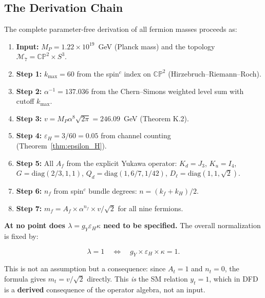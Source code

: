 \documentclass[11pt,a4paper]{article}
\newcommand{\CP}{\mathbb{CP}}
\theoremstyle{definition}
\theoremstyle{remark}
\begin{document}
\subsection{The Derivation Chain}

The complete parameter-free derivation of all fermion masses proceeds as:

\begin{enumerate}
\item \textbf{Input:} $M_P = 1.22 \times 10^{19}$~GeV (Planck mass)
  and the topology $\mathcal{M}_7 = \CP^2 \times S^3$.

\item \textbf{Step 1:} $k_{\max} = 60$ from the spin$^c$ index on $\CP^2$
  (Hirzebruch--Riemann--Roch).

\item \textbf{Step 2:} $\alpha^{-1} = 137.036$ from the Chern--Simons
  weighted level sum with cutoff $k_{\max}$.

\item \textbf{Step 3:} $v = M_P\alpha^8\sqrt{2\pi} = 246.09$~GeV
  (Theorem K.2).

\item \textbf{Step 4:} $\varepsilon_H = 3/60 = 0.05$ from channel counting
  (Theorem~\ref{thm:epsilon_H}).

\item \textbf{Step 5:} All $A_f$ from the explicit Yukawa operator:
  $K_d = J_3$, $K_u = I_4$, $G = \mathrm{diag}(2/3, 1, 1)$,
  $Q_d = \mathrm{diag}(1, 6/7, 1/42)$, $D_\ell = \mathrm{diag}(1, 1, \sqrt{2})$.

\item \textbf{Step 6:} $n_f$ from spin$^c$ bundle degrees:
  $n = (k_f + k_H)/2$.

\item \textbf{Step 7:} $m_f = A_f \times \alpha^{n_f} \times v/\sqrt{2}$
  for all nine fermions.
\end{enumerate}

\textbf{At no point does $\lambda = g_Y\varepsilon_H\kappa$ need to be
specified.} The overall normalization is fixed by:

\begin{equation}
\lambda = 1 \quad \Longleftrightarrow \quad
g_Y \times \varepsilon_H \times \kappa = 1.
\end{equation}

This is not an assumption but a consequence: since $A_t = 1$ and $n_t = 0$,
the formula gives $m_t = v/\sqrt{2}$ directly. This \emph{is} the SM relation
$y_t = 1$, which in DFD is a \textbf{derived} consequence of the operator
algebra, not an input.
\end{document}
